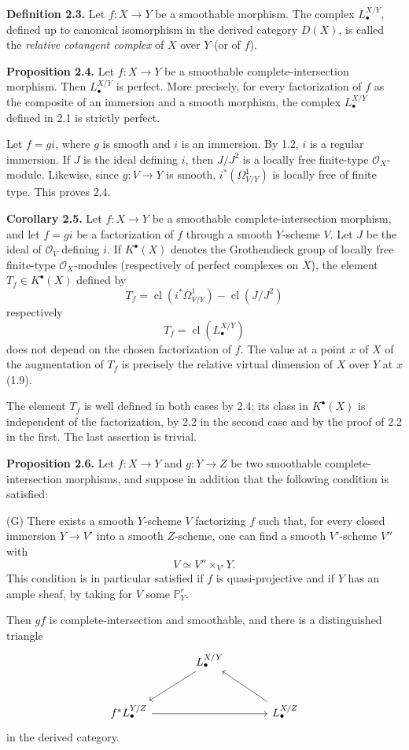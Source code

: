 \documentclass[11pt]{article}
\begin{document}
\textbf{Definition 2.3.} Let $f:X\to Y$ be a smoothable morphism. The complex $L^{X/Y}_\bullet$, defined up to canonical isomorphism in the derived category $D(X)$, is called the \emph{relative cotangent complex} of $X$ over $Y$ (or of $f$).

\textbf{Proposition 2.4.} Let $f:X\to Y$ be a smoothable complete-intersection morphism. Then $L^{X/Y}_\bullet$ is perfect. More precisely, for every factorization of $f$ as the composite of an immersion and a smooth morphism, the complex $L^{X/Y}_\bullet$ defined in 2.1 is strictly perfect.

Let $f=g i$, where $g$ is smooth and $i$ is an immersion. By 1.2, $i$ is a regular immersion. If $J$ is the ideal defining $i$, then $J/J^2$ is a locally free finite-type $\mathcal O_X$-module. Likewise, since $g:V\to Y$ is smooth, $i^*(\Omega^1_{V/Y})$ is locally free of finite type. This proves 2.4.

\textbf{Corollary 2.5.} Let $f:X\to Y$ be a smoothable complete-intersection morphism, and let $f=gi$ be a factorization of $f$ through a smooth $Y$-scheme $V$. Let $J$ be the ideal of $\mathcal O_V$ defining $i$. If $K^{\bullet}(X)$ denotes the Grothendieck group of locally free finite-type $\mathcal O_X$-modules (respectively of perfect complexes on $X$), the element $T_f\in K^{\bullet}(X)$ defined by
\[
T_f=\operatorname{cl}(i^*\Omega^1_{V/Y})-\operatorname{cl}(J/J^2)
\]
respectively
\[
T_f=\operatorname{cl}(L^{X/Y}_\bullet)
\]
does not depend on the chosen factorization of $f$. The value at a point $x$ of $X$ of the augmentation of $T_f$ is precisely the relative virtual dimension of $X$ over $Y$ at $x$ (1.9).

The element $T_f$ is well defined in both cases by 2.4; its class in $K^{\bullet}(X)$ is independent of the factorization, by 2.2 in the second case and by the proof of 2.2 in the first. The last assertion is trivial.

\textbf{Proposition 2.6.} Let $f:X\to Y$ and $g:Y\to Z$ be two smoothable complete-intersection morphisms, and suppose in addition that the following condition is satisfied:

(G) There exists a smooth $Y$-scheme $V$ factorizing $f$ such that, for every closed immersion $Y\to V'$ into a smooth $Z$-scheme, one can find a smooth $V'$-scheme $V''$ with
\[
V \simeq V''\times_{V'}Y.
\]
This condition is in particular satisfied if $f$ is quasi-projective and if $Y$ has an ample sheaf, by taking for $V$ some $\mathbb P^r_Y$.

Then $gf$ is complete-intersection and smoothable, and there is a distinguished triangle
\[
\begin{tikzcd}[column sep=large,row sep=large]
& L^{X/Y}_\bullet \arrow[dl] \\
f^*L^{Y/Z}_\bullet \arrow[rr] && L^{X/Z}_\bullet \arrow[ul]
\end{tikzcd}
\]
in the derived category.
\end{document}
